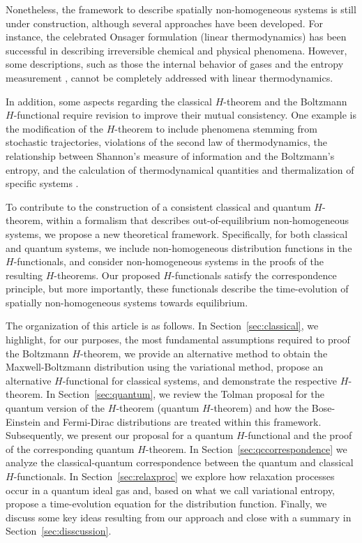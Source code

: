Nonetheless, the framework to describe spatially non-homogeneous systems is still
under construction, although several approaches have been developed. For instance,
the celebrated Onsager formulation (linear thermodynamics)
\cite{bib:keizer1987,bib:onsager1931} has been successful in describing irreversible chemical 
and physical phenomena. However, some descriptions, such as those the internal behavior of gases
\cite{bib:zanotto2018} and the entropy measurement
\cite{bib:schmelzer2018,bib:nemilov2018}, cannot be completely addressed with linear thermodynamics.

In addition, some aspects regarding the classical $H$-theorem and the
Boltzmann $H$-functional require revision to improve their mutual consistency.
One example is the modification of the $H$-theorem to include phenomena stemming from stochastic
trajectories, violations of the second law of thermodynamics, the relationship
between Shannon’s measure of information and the Boltzmann’s entropy, 
and the calculation of thermodynamical quantities and thermalization of specific systems
\cite{bib:gorban2014,bib:li2019,bib:gring2012,bib:nemilov2018,bib:wang2014}.

To contribute to the construction of a consistent classical and
quantum $H$-theorem, within a formalism that describes out-of-equilibrium
non-homogeneous systems, we propose a new theoretical framework.
Specifically, for both classical and quantum systems, we include non-homogeneous distribution functions in
the $H$-functionals, and consider non-homogeneous systems in the proofs of the resulting
$H$-theorems. Our proposed $H$-functionals satisfy
the correspondence principle, but more importantly, these functionals describe
the time-evolution of spatially non-homogeneous
systems towards equilibrium.

The organization of this article is as follows.
In Section~\ref{sec:classical}, we highlight, for our purposes, the most
fundamental assumptions required to proof the Boltzmann $H$-theorem,
we provide an alternative method to obtain the Maxwell-Boltzmann
distribution using the variational method, propose
an alternative $H$-functional for classical systems, and demonstrate
the respective $H$-theorem. In Section~\ref{sec:quantum},
we review the Tolman proposal for the quantum
version of the $H$-theorem (quantum $H$-theorem)
and how the Bose-Einstein and Fermi-Dirac distributions are treated within
this framework. Subsequently, we present our proposal for a quantum $H$-functional
and the proof of the corresponding quantum $H$-theorem. In 
Section~\ref{sec:qccorrespondence}
we analyze the classical-quantum correspondence between the
quantum and classical $H$-functionals.
In Section~\ref{sec:relaxproc} we explore how relaxation processes occur
in a quantum ideal gas and, based on what we call variational entropy,
propose a time-evolution equation for the distribution function. Finally,
we discuss some key ideas resulting from our approach and close with a summary
in Section~\ref{sec:disscussion}.

